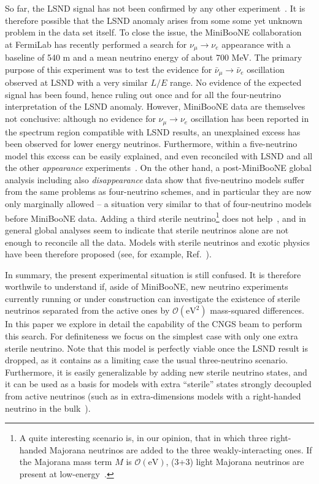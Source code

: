 \documentclass[12pt]{elsart}
\newcommand{\eVq}{\ensuremath{\text{eV}^2}}
\begin{document}
So far, the LSND signal has not been confirmed by any other
experiment~\cite{Church:2002tc}. It is therefore possible that the
LSND anomaly arises from some some yet unknown problem in the data set
itself. To close the issue, the MiniBooNE
collaboration~\cite{AguilarArevalo:2007it} at FermiLab has recently
performed a search for $\nu_\mu \to \nu_e$ appearance with a baseline
of 540 m and a mean neutrino energy of about 700 MeV. The primary
purpose of this experiment was to test the evidence for $\bar \nu_\mu
\to \bar \nu_e$ oscillation observed at LSND with a very similar $L/E$
range.  No evidence of the expected signal has been found, hence
ruling out once and for all the four-neutrino interpretation of the
LSND anomaly. However, MiniBooNE data are themselves not conclusive:
although no evidence for $\nu_\mu \to \nu_e$ oscillation has been
reported in the spectrum region compatible with LSND results, an
unexplained excess has been observed for lower energy neutrinos.
Furthermore, within a five-neutrino model this excess can be easily
explained, and even reconciled with LSND and all the other
\emph{appearance} experiments~\cite{Maltoni:2007zf}. On the other
hand, a post-MiniBooNE global analysis including also
\emph{disappearance} data show that five-neutrino models suffer from
the same problems as four-neutrino schemes, and in particular they are
now only marginally allowed -- a situation very similar to that of
four-neutrino models before MiniBooNE data. Adding a third sterile
neutrino\footnote{A quite interesting scenario is, in our opinion,
that in which three right-handed Majorana neutrinos are added to the
three weakly-interacting ones.  If the Majorana mass term $M$ is
$\mathcal{O}(\text{eV})$, (3+3) light Majorana neutrinos are present
at low-energy~\cite{deGouvea:2005er, deGouvea:2006gz}.} does not
help~\cite{Maltoni:2007zf}, and in general global analyses seem to
indicate that sterile neutrinos alone are not enough to reconcile all
the data. Models with sterile neutrinos and exotic physics have been
therefore proposed (see, for example,
Ref.~\cite{PalomaresRuiz:2005vf}).

In summary, the present experimental situation is still confused. It
is therefore worthwile to understand if, aside of MiniBooNE, new
neutrino experiments currently running or under construction can
investigate the existence of sterile neutrinos separated from the
active ones by $\mathcal{O}(\eVq)$ mass-squared differences. In this
paper we explore in detail the capability of the CNGS beam to perform
this search. For definiteness we focus on the simplest case with only
one extra sterile neutrino. Note that this model is perfectly viable
once the LSND result is dropped, as it contains as a limiting case the
usual three-neutrino scenario. Furthermore, it is easily generalizable
by adding new sterile neutrino states, and it can be used as a basis
for models with extra ``sterile'' states strongly decoupled from
active neutrinos (such as in extra-dimensions models with a
right-handed neutrino in the bulk~\cite{Pas:2005rb}).
\end{document}
